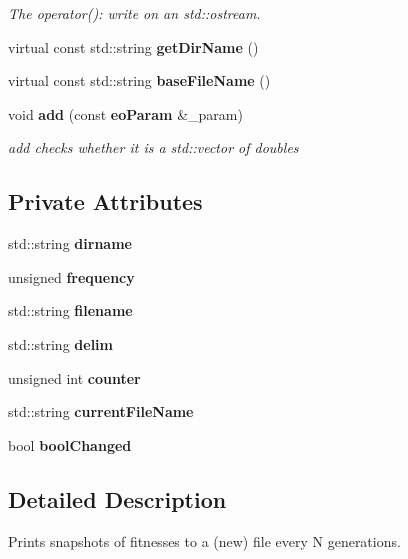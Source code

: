 \begin{CompactItemize}
\begin{CompactList}\small\item\em The operator(): write on an std::ostream. \item\end{CompactList}\item 
virtual const std::string {\bf get\-Dir\-Name} ()\label{classeo_file_snapshot_a7}

\item 
virtual const std::string {\bf base\-File\-Name} ()\label{classeo_file_snapshot_a8}

\item 
void {\bf add} (const {\bf eo\-Param} \&\_\-param)\label{classeo_file_snapshot_a9}

\begin{CompactList}\small\item\em add checks whether it is a std::vector of doubles \item\end{CompactList}\end{CompactItemize}
\subsection*{Private Attributes}
\begin{CompactItemize}
\item 
std::string {\bf dirname}\label{classeo_file_snapshot_r0}

\item 
unsigned {\bf frequency}\label{classeo_file_snapshot_r1}

\item 
std::string {\bf filename}\label{classeo_file_snapshot_r2}

\item 
std::string {\bf delim}\label{classeo_file_snapshot_r3}

\item 
unsigned int {\bf counter}\label{classeo_file_snapshot_r4}

\item 
std::string {\bf current\-File\-Name}\label{classeo_file_snapshot_r5}

\item 
bool {\bf bool\-Changed}\label{classeo_file_snapshot_r6}

\end{CompactItemize}


\subsection{Detailed Description}
Prints snapshots of fitnesses to a (new) file every N generations. 

